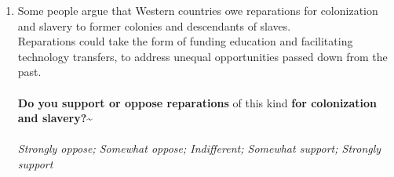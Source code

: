 \begin{enumerate}[resume]
\item  \label{q:reparations_support} Some people argue that Western countries owe reparations for colonization and slavery to former colonies and descendants of slaves. \\Reparations could take the form of funding education and facilitating technology transfers, to address unequal opportunities passed down from the past. \\\\\textbf{Do you support or oppose reparations} of this kind \textbf{for colonization and slavery?\~}\\ [\textit{Figure \ref{fig:reparations_support}}; 
\verb|reparations_support|]
  \\ \textit{Strongly oppose; Somewhat oppose; Indifferent; Somewhat support; Strongly support}

\end{enumerate} 

